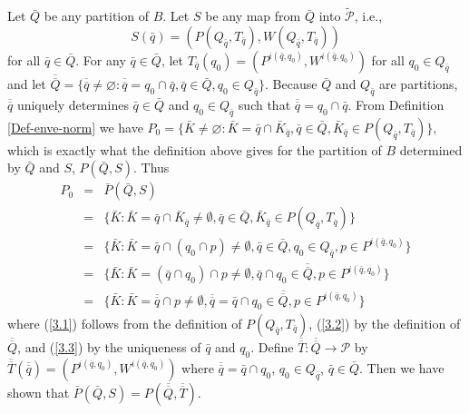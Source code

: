 \documentclass[12pt]{amsart}
\theoremstyle{definition}
\theoremstyle{remark}
\numberwithin{equation}{section}
\begin{document}
Let $\bar{Q}$ be any partition of $B$.  Let $S$ be any map from
 $\bar{Q}$ into $\tilde{\mathcal{P}}$, i.e.,
$$S(\bar{q})=\left(P(Q_{\bar{q}}, T_{\bar{q}}),W(Q_{\bar{q}},
 T_{\bar{q}})\right)$$
 for all  $\bar{q} \in \bar{Q}$. 
For any $\bar{q}\in \bar{Q}$, let
 $T_{\bar{q}}(q_0)=(P^{i(\bar{q}, q_0)}, W^{i(\bar{q}, q_0)})$ 
for all $q_0\in Q_{\bar{q}}$ and 
let $\overline{\overline{Q}}=\{\overline{\overline{q}}\neq \varnothing :
 \overline{\overline{q}}=q_0 \cap \bar{q}, \bar{q}\in
 \bar{Q}, q_0\in Q_{\bar{q}}\}$.
Because $\bar{Q}$ and $Q_{\bar{q}}$ are partitions,
 $\overline{\overline{q}}$ uniquely determines $\bar{q}
 \in \bar{Q}$ and $q_0 \in Q_{\bar{q}}$ such that 
$\overline{\overline{q}}=q_0 \cap \bar{q}$.
From Definition \ref{Def-enve-norm} we have
$P_0=\{\bar{K}\neq \varnothing: \bar{K}=\bar{q}\cap 
\bar{K}_{\bar{q}}, \bar{q}\in \bar{Q}, \bar{K}_{\bar{q}}
\in P(Q_{\bar{q}},T_{\bar{q}})\}$,
which is exactly what the definition above gives 
 for the partition of $B$ determined by 
$\bar{Q}$ and $S$, $P(\bar{Q}, S)$. Thus
\begin{eqnarray}
P_0&=&\bar{P}(\bar{Q}, S)\nonumber\\
&=&\{\bar{K}: \bar{K}=\bar{q}\cap 
\bar{K}_{\bar{q}}\neq \emptyset, \bar{q}\in \bar{Q}, \bar{K}_{\bar{q}}
\in P(Q_{\bar{q}},T_{\bar{q}})\}\nonumber\\
&=&\{\bar{K}: \bar{K}=\bar{q}\cap(q_0\cap p)\neq \emptyset, 
\bar{q}\in \bar{Q},
 q_0 \in Q_{\bar{q}}, p\in P^{i(\bar{q},q_0)}\}\label{3.1}\\
&=&\{\bar{K}: \bar{K}=(\bar{q}\cap q_0)\cap p\neq \emptyset, \bar{q}\cap q_0\in
 \overline{\overline{Q}}, p\in P^{i(\bar{q}, q_0)}\}\label{3.2}\\
&=&\{\bar{K}: \bar{K}=\overline{\overline{q}}\cap p\neq \emptyset,
 \overline{\overline{q}}=\bar{q}\cap q_0\in \overline{\overline{Q}},
 p\in P^{i(\bar{q}, q_0)}\}\label{3.3}
\end{eqnarray}
where (\ref{3.1}) follows from the definition of $P(Q_{\bar{q}},
T_{\bar{q}})$, (\ref{3.2}) by the definition of $\overline{\overline{Q}}$, and
(\ref{3.3}) by the uniqueness of $\bar{q}$ and $q_0$.
Define $\overline{\overline{T}}: \overline{\overline{Q}}
 \rightarrow \mathcal{P}$ by 
$ \overline{\overline{T}}(\overline{\overline{q}})
=(P^{i(\bar{q}, q_0)},W^{i(\bar{q}, q_0)})$
where $\overline{\overline{q}}=\bar{q}\cap q_0$, $q_0 
\in Q_{\bar{q}}$, $\bar{q}\in \bar{Q}$. Then we have shown that
 $\bar{P}(\bar{Q},
 S)=P(\overline{\overline{Q}},\overline{\overline{T}})$.\\
\end{document}
